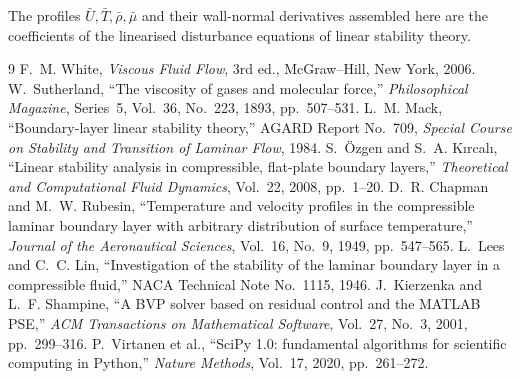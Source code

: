 \documentclass[11pt]{article}
\begin{document}
The profiles $\bar U,\bar T,\bar\rho,\bar\mu$ and their wall-normal derivatives assembled here are
the coefficients of the linearised disturbance equations of linear stability theory.

\begin{thebibliography}{9}
 F.~M. White, \emph{Viscous Fluid Flow}, 3rd ed., McGraw--Hill, New York, 2006.
 W.~Sutherland, ``The viscosity of gases and molecular force,''
  \emph{Philosophical Magazine}, Series~5, Vol.~36, No.~223, 1893, pp.~507--531.
 L.~M. Mack, ``Boundary-layer linear stability theory,'' AGARD Report No.~709,
  \emph{Special Course on Stability and Transition of Laminar Flow}, 1984.
 S.~\"Ozgen and S.~A. K{\i}rcal{\i}, ``Linear stability analysis in compressible,
  flat-plate boundary layers,'' \emph{Theoretical and Computational Fluid Dynamics}, Vol.~22, 2008,
  pp.~1--20.
 D.~R. Chapman and M.~W. Rubesin, ``Temperature and velocity profiles in the
  compressible laminar boundary layer with arbitrary distribution of surface temperature,''
  \emph{Journal of the Aeronautical Sciences}, Vol.~16, No.~9, 1949, pp.~547--565.
 L.~Lees and C.~C. Lin, ``Investigation of the stability of the laminar boundary
  layer in a compressible fluid,'' NACA Technical Note No.~1115, 1946.
 J.~Kierzenka and L.~F. Shampine, ``A BVP solver based on residual control and
  the MATLAB PSE,'' \emph{ACM Transactions on Mathematical Software}, Vol.~27, No.~3, 2001,
  pp.~299--316.
 P.~Virtanen et al., ``SciPy 1.0: fundamental algorithms for scientific computing
  in Python,'' \emph{Nature Methods}, Vol.~17, 2020, pp.~261--272.
\end{thebibliography}
\end{document}
